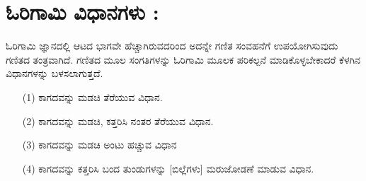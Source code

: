 \section*{ಓರಿಗಾಮಿ ವಿಧಾನಗಳು : } ಓರಿಗಾಮಿ ಜ್ಞಾನದಲ್ಲಿ ಆಟದ ಭಾಗವೇ ಹೆಚ್ಚಾಗಿರುವದರಿಂದ ಅದನ್ನೇ ಗಣಿತ ಸಂವಹನೆಗೆ ಉಪಯೋಗಿಸುವುದು ಗಣಿತದ ತಂತ್ರವಾಗಿದೆ. ಗಣಿತದ ಮೂಲ ಸಂಗತಿಗಳನ್ನು ಓರಿಗಾಮಿ ಮೂಲಕ ಪರಿಕಲ್ಪನೆ ಮಾಡಿಕೊಳ್ಳಬೇಕಾದರೆ ಕೆಳಗಿನ ವಿಧಾನಗಳನ್ನು ಬಳಸಲಾಗುತ್ತದೆ. 
\begin{itemize}
\item[(1)] ಕಾಗದವನ್ನು ಮಡಚಿ ತೆರೆಯುವ ವಿಧಾನ.
\item[(2)] ಕಾಗದವನ್ನು ಮಡಚಿ, ಕತ್ತರಿಸಿ ನಂತರ ತೆರೆಯುವ ವಿಧಾನ.
\item[(3)] ಕಾಗದವನ್ನು ಮಡಚಿ ಅಂಟು ಹಚ್ಚುವ ವಿಧಾನ
\item[(4)] ಕಾಗದವನ್ನು ಕತ್ತರಿಸಿ ಬಂದ ತುಂಡುಗಳನ್ನು [ಬಿಲ್ಲೆಗಳು] ಮರುಜೋಡಣೆ ಮಾಡುವ ವಿಧಾನ.
\end{itemize}


